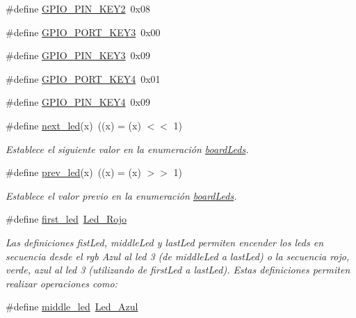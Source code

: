 \begin{DoxyCompactItemize}
\item 
\#define \hyperlink{group__hardware_ga6fe528c749e6e3df18c66c78841fd2ae}{G\+P\+I\+O\+\_\+\+P\+I\+N\+\_\+\+K\+E\+Y2}~0x08
\item 
\#define \hyperlink{group__hardware_ga6e75308c8b20c3236d0449a07bb052f7}{G\+P\+I\+O\+\_\+\+P\+O\+R\+T\+\_\+\+K\+E\+Y3}~0x00
\item 
\#define \hyperlink{group__hardware_ga6058161cd4273d1df2af95589e043055}{G\+P\+I\+O\+\_\+\+P\+I\+N\+\_\+\+K\+E\+Y3}~0x09
\item 
\#define \hyperlink{group__hardware_ga6d16f3a208324c46c462f92ad249d199}{G\+P\+I\+O\+\_\+\+P\+O\+R\+T\+\_\+\+K\+E\+Y4}~0x01
\item 
\#define \hyperlink{group__hardware_gabeaec154a7007cd91de9a8c775f4242f}{G\+P\+I\+O\+\_\+\+P\+I\+N\+\_\+\+K\+E\+Y4}~0x09
\item 
\#define \hyperlink{group__hardware_ga8dec203447e10cef9a4a1013f7c4cdd4}{next\+\_\+led}(x)~((x) = (x) $<$$<$ 1)
\begin{DoxyCompactList}\small\item\em Establece el siguiente valor en la enumeración \hyperlink{group__hardware_ga2a000bf02da2abba53355f3fcfdb2d0b}{board\+Leds}. \end{DoxyCompactList}\item 
\#define \hyperlink{group__hardware_ga6cc9878768b184e23371bbeb95360713}{prev\+\_\+led}(x)~((x) = (x) $>$$>$ 1)
\begin{DoxyCompactList}\small\item\em Establece el valor previo en la enumeración \hyperlink{group__hardware_ga2a000bf02da2abba53355f3fcfdb2d0b}{board\+Leds}. \end{DoxyCompactList}\item 
\#define \hyperlink{group__hardware_ga43a19ad1766c3719e591430d601496f7}{first\+\_\+led}~\hyperlink{group__hardware_gga84e58e8cc8e3fe349be97bcd3221c360a5662baf6795c7030ea75e47a0019a61d}{Led\+\_\+\+Rojo}
\begin{DoxyCompactList}\small\item\em Las definiciones fist\+Led, middle\+Led y last\+Led permiten encender los leds en secuencia desde el rgb Azul al led 3 (de middle\+Led a last\+Led) o la secuencia rojo, verde, azul al led 3 (utilizando de first\+Led a last\+Led). Estas definiciones permiten realizar operaciones como\+: \end{DoxyCompactList}\item 
\#define \hyperlink{group__hardware_gacbd2343998132167826e577781d85bbd}{middle\+\_\+led}~\hyperlink{group__hardware_gga84e58e8cc8e3fe349be97bcd3221c360a90357fded550cd38cda43991725234cb}{Led\+\_\+\+Azul}

\end{DoxyCompactItemize}
